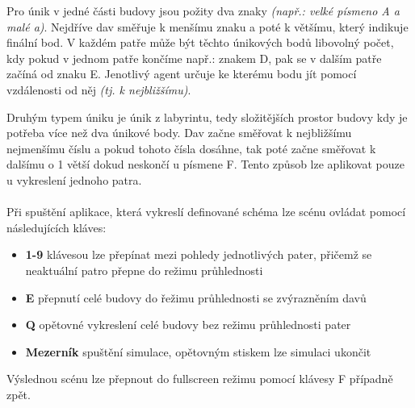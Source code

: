 \documentclass[czech,public,dept460,male,cpdeclaration]{diploma}
\begin{document}
Pro únik v jedné části budovy jsou požity dva znaky \textit{(např.: velké  písmeno A a malé a)}. Nejdříve dav směřuje k menšímu znaku a poté k většímu, který indikuje finální bod. V každém patře může být těchto únikových bodů libovolný počet, kdy pokud v jednom patře končíme např.: znakem D, pak se v dalším patře začíná od znaku E. Jenotlivý agent určuje ke kterému bodu jít pomocí vzdálenosti od něj \textit{(tj. k nejbližšímu)}.

Druhým typem úniku je únik z labyrintu, tedy složitějších prostor budovy kdy je potřeba více než dva únikové body. Dav začne směřovat k nejbližšímu nejmenšímu číslu a pokud tohoto čísla dosáhne, tak poté začne směřovat k dalšímu o 1 větší dokud neskončí u písmene F. Tento způsob lze aplikovat pouze u vykreslení jednoho patra. 
\\\\
Při spuštění aplikace, která vykreslí definované schéma lze scénu ovládat pomocí následujících kláves:

\begin{itemize}
	\item \textbf{1-9} klávesou lze přepínat mezi pohledy jednotlivých pater, přičemž se neaktuální patro přepne do režimu průhlednosti
	\item \textbf{E} přepnutí celé budovy do řežimu průhlednosti se zvýrazněním davů
	\item \textbf{Q} opětovné vykreslení celé budovy bez režimu průhlednosti pater
	\item \textbf{Mezerník} spuštění simulace, opětovným stiskem lze simulaci ukončit
\end{itemize}

Výslednou scénu lze přepnout do fullscreen režimu pomocí klávesy F případně zpět.
\end{document}
